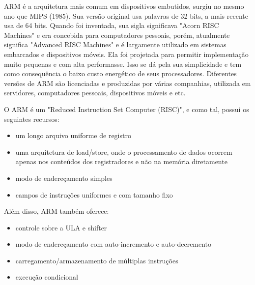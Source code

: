 ARM é a arquitetura mais comum em dispositivos embutidos, surgiu no mesmo ano que MIPS (1985). Sua versão original usa palavras de 32 bits, a mais recente usa de 64 bits. Quando foi inventada, sua sigla significava "Acorn RISC Machines" e era concebida para computadores pessoais, porém, atualmente significa "Advanced RISC Machines" e é largamente utilizado em sistemas embarcados e dispositivos móveis. Ela foi projetada para permitir implementação muito pequenas e com alta performasse. Isso se dá pela sua simplicidade e tem como consequência o baixo custo energético de seus processadores. Diferentes versões de ARM são licenciadas e produzidas por várias companhias, utilizada em servidores, computadores pessoais, dispositivos móveis e etc.

O ARM é um "Reduced Instruction Set Computer (RISC)", e como tal, possui os seguintes recursos:
\begin{itemize}
	\item um longo arquivo uniforme de registro
	\item uma arquitetura de load/store, onde o processamento de dados ocorrem apenas nos conteúdos dos registradores e não na memória diretamente
	\item modo de endereçamento simples
	\item campos de instruções uniformes e com tamanho fixo
\end{itemize}

Além disso, ARM também oferece:

\begin{itemize}
	\item controle sobre a ULA e shifter
	\item modo de endereçamento com auto-incremento e auto-decremento
	\item carregamento/armazenamento de múltiplas instruções
	\item execução condicional
\end{itemize}